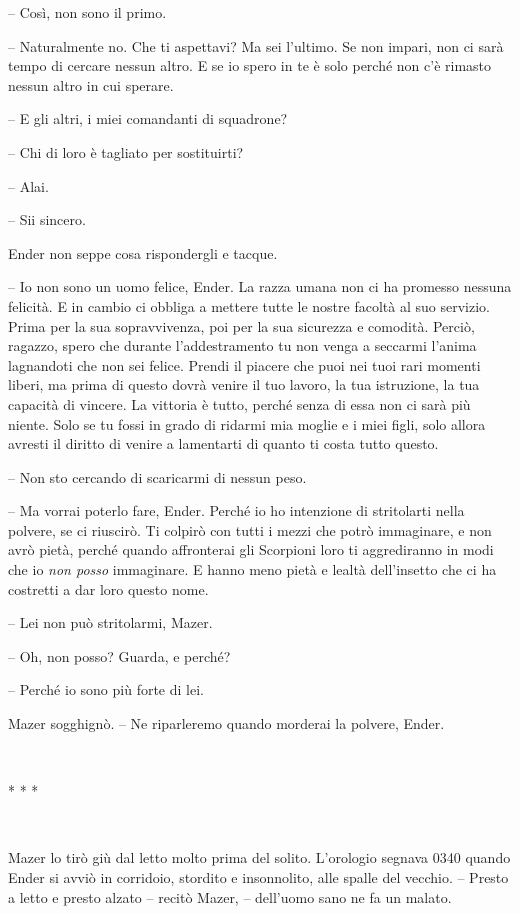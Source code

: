{-- Così, non sono il primo.}

{-- Naturalmente no. Che ti aspettavi? Ma sei l'ultimo. Se non impari,
	non ci sarà tempo di cercare nessun altro. E se io spero in te è solo
	perché non c'è rimasto nessun altro in cui sperare.}

{-- E gli altri, i miei comandanti di squadrone?}

{-- Chi di loro è tagliato per sostituirti?}

{-- Alai.}

{-- Sii sincero.}

{Ender non seppe cosa rispondergli e tacque.}

{-- Io non sono un uomo felice, Ender. La razza umana non ci ha promesso
	nessuna felicità. E in cambio ci obbliga a mettere tutte le nostre
	facoltà al suo servizio. Prima per la sua sopravvivenza, poi per la sua
	sicurezza e comodità. Perciò, ragazzo, spero che durante l'addestramento
	tu non venga a seccarmi l'anima lagnandoti che non sei felice. Prendi il
	piacere che puoi nei tuoi rari momenti liberi, ma prima di questo dovrà
	venire il tuo lavoro, la tua istruzione, la tua capacità di vincere. La
	vittoria è tutto, perché senza di essa non ci sarà più niente. Solo se
	tu fossi in grado di ridarmi mia moglie e i miei figli, solo allora
	avresti il diritto di venire a lamentarti di quanto ti costa tutto
	questo.}

{-- Non sto cercando di scaricarmi di nessun peso.}

{-- Ma vorrai poterlo fare, Ender. Perché io ho intenzione di
	stritolarti nella polvere, se ci riuscirò. Ti colpirò con tutti i mezzi
	che potrò immaginare, e non avrò pietà, perché quando affronterai gli
	Scorpioni loro ti aggrediranno in modi che io \emph{non posso}
	immaginare. E hanno meno pietà e lealtà dell'insetto che ci ha costretti
	a dar loro questo nome.}

{-- Lei non può stritolarmi, Mazer.}

{-- Oh, non posso? Guarda, e perché?}

{-- Perché io sono più forte di lei.}

{Mazer sogghignò. -- Ne riparleremo quando morderai la polvere, Ender.}

{~}

\begin{center}
	{* * *}
\end{center}

{~}

{Mazer lo tirò giù dal letto molto prima del solito. L'orologio segnava
	0340 quando Ender si avviò in corridoio, stordito e insonnolito, alle
	spalle del vecchio. -- Presto a letto e presto alzato -- recitò Mazer,
	-- dell'uomo sano ne fa un malato.}

